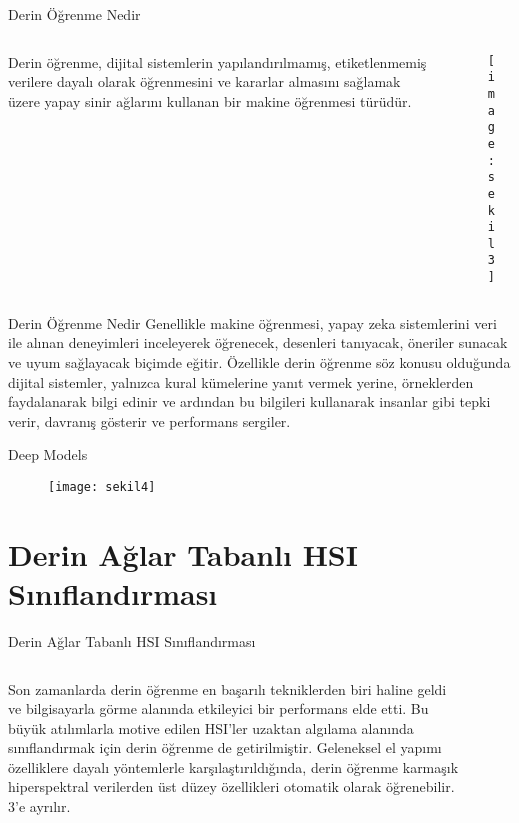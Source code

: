 \documentclass{beamer}
\begin{document}
\begin{frame}{Derin Öğrenme Nedir}
  \begin{columns}
    \begin{column}{0.6\textwidth}
Derin öğrenme, dijital sistemlerin yapılandırılmamış, etiketlenmemiş verilere dayalı olarak öğrenmesini ve kararlar almasını sağlamak üzere yapay sinir ağlarını kullanan bir makine öğrenmesi türüdür.
    \end{column}
    \begin{column}{0.6\textwidth}
      \begin{figure}
    \texttt{[image: sekil3]}
      \end{figure}
    \end{column}
  \end{columns}
\end{frame}

\begin{frame}{Derin Öğrenme Nedir}
  Genellikle makine öğrenmesi, yapay zeka sistemlerini veri ile alınan deneyimleri inceleyerek öğrenecek, desenleri tanıyacak, öneriler sunacak ve uyum sağlayacak biçimde eğitir. Özellikle derin öğrenme söz konusu olduğunda dijital sistemler, yalnızca kural kümelerine yanıt vermek yerine, örneklerden faydalanarak bilgi edinir ve ardından bu bilgileri kullanarak insanlar gibi tepki verir, davranış gösterir ve performans sergiler.
\end{frame}

\begin{frame}{Deep Models }
  \begin{figure}
    \centering
    \texttt{[image: sekil4]}
  \end{figure}
\end{frame}

\section{Derin Ağlar Tabanlı HSI Sınıflandırması}
\begin{frame}{Derin Ağlar Tabanlı HSI Sınıflandırması}
\begin{columns}
  \begin{column}[]{0.7\textwidth}
Son zamanlarda derin öğrenme en başarılı tekniklerden biri haline geldi ve bilgisayarla görme alanında etkileyici bir performans elde etti. Bu büyük atılımlarla motive edilen HSI’ler uzaktan algılama alanında sınıflandırmak için derin öğrenme de getirilmiştir. Geleneksel el yapımı özelliklere dayalı yöntemlerle karşılaştırıldığında, derin öğrenme karmaşık hiperspektral verilerden üst düzey özellikleri otomatik olarak öğrenebilir. 3’e ayrılır.
  \end{column}
  \begin{column}[]{0.6\textwidth}
    \begin{figure}[]
      \texttt{[image: sekil5]}
    \end{figure}
  \end{column}
\end{columns}
\end{frame}
\end{document}
